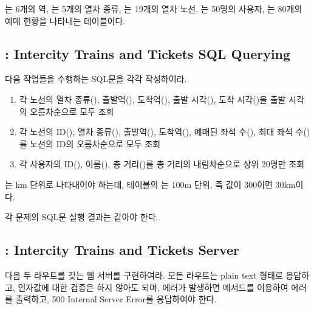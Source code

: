 는 6개의 역, 는 5개의 열차 종류, 는 19개의 열차 노선, 는 50명의 사용자, 는 80개의 예매 현황을 나타내는 테이블이다.

\subsection*{: Intercity Trains and Tickets SQL Querying}

다음 작업들을 수행하는 SQL문을 각각 작성하여라.

\begin{enumerate}
    \item 각 노선의 열차 종류(), 출발역(), 도착역(), 출발 시각(), 도착 시각()을 출발 시각의 오름차순으로 모두 조회
    \item 각 노선의 ID(), 열차 종류(), 출발역(), 도착역(), 예매된 좌석 수(), 최대 좌석 수()를 노선의 ID의 오름차순으로 모두 조회
    \item 각 사용자의 ID(), 이름(), 총 거리()를 총 거리의 내림차순으로 상위 20명만 조회
\end{enumerate}

는 km 단위로 나타내어야 하는데,  테이블의 는 100m 단위, 즉 값이 300이면 30km이다.


각 문제의 SQL문 실행 결과는 \와 같아야 한다.

\subsection*{: Intercity Trains and Tickets Server}

다음 두 라우트를 갖는 웹 서버를 구현하여라. 모든 라우트는 plain text 형태로 응답하고, 인자값에 대한 검증은 하지 않아도 되며, 에러가 발생하면  메서드를 이용하여 에러를 출력하고, 500 Internal Server Error를 응답하여야 한다.


